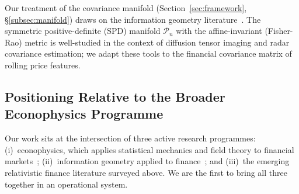 Our treatment of the covariance manifold (Section~\ref{sec:framework},
§\ref{subsec:manifold}) draws on the information geometry
literature~\cite{Amari1998, Pennec2006, Nielsen2020}.  The symmetric
positive-definite (SPD) manifold $\mathcal{P}_n$ with the
affine-invariant (Fisher-Rao) metric is well-studied in the context of
diffusion tensor imaging and radar covariance estimation; we adapt these
tools to the financial covariance matrix of rolling price features.

\subsection{Positioning Relative to the Broader Econophysics Programme}

Our work sits at the intersection of three active research programmes:
(i)~econophysics, which applies statistical mechanics and field theory to
financial markets~\cite{Mantegna1999, Bouchaud2003};
(ii)~information geometry applied to finance~\cite{Amari1998}; and
(iii)~the emerging relativistic finance literature surveyed above.  We are
the first to bring all three together in an operational system.
